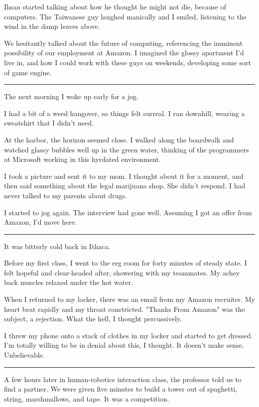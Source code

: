 Ihsan started talking about how he thought he might not die, because of
computers.  The Taiwanese guy laughed manically and I smiled, listening to the
wind in the damp leaves above.

We hesitantly talked about the future of computing, referencing the imminent
possibility of our employment at Amazon.  I imagined the glossy apartment I'd
live in, and how I could work with these guys on weekends, developing some
sort of game engine.

\plainfancybreak{12pt}{2}{}

The next morning I woke up early for a jog.

I had a bit of a weed hangover, so things felt surreal.  I ran downhill, wearing
a sweatshirt that I didn't need.

At the harbor, the horizon seemed close.  I walked along the boardwalk and
watched glassy bubbles well up in the green water, thinking of the programmers
at Microsoft working in this hyrdated environment.

I took a picture and sent it to my mom.  I thought about it for a moment, and
then said something about the legal marijuana shop.  She didn't respond.  I had
never talked to my parents about drugs.

I started to jog again.  The interview had gone well.  Assuming I got an offer
from Amazon, I'd move here. 

\plainfancybreak{12pt}{2}{}

It was bitterly cold back in Ithaca.

Before my first class, I went to the erg room for forty minutes of steady state.
I felt hopeful and clear-headed after, showering with my teammates.  My achey
back muscles relaxed under the hot water.

When I returned to my locker, there was an email from my Amazon recruiter.  My
heart beat rapidly and my throat constricted.  "Thanks From Amazon" was the
subject, a rejection.  What the hell, I thought percussively. 

I threw my phone onto a stack of clothes in my locker and started to get
dressed.  I'm totally willing to be in denial about this, I thought.  It doesn't
make sense.  Unbelievable. 

\plainfancybreak{12pt}{2}{}

A few hours later in human-robotics interaction class, the professor told us to
find a partner.  We were given five minutes to build a tower out of spaghetti,
string, marshmallows, and tape.  It was a competition.

